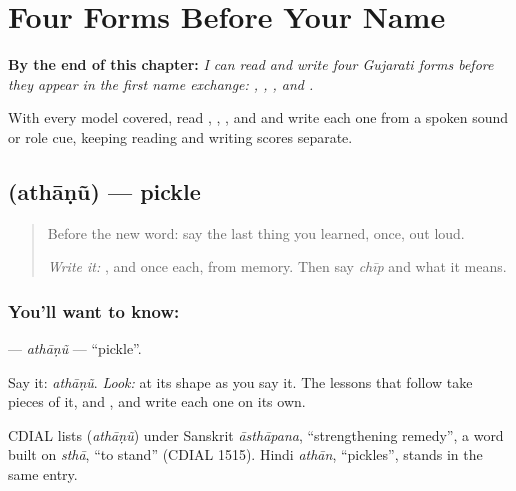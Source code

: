 
\chapter{Four Forms Before Your Name}
\label{ch:gu-first-use-forms-a}

\begin{chapteropening}
\textbf{By the end of this chapter:} \emph{I can read and write four Gujarati forms before they appear in the first name exchange: , , , and .}

With every model covered, read , , , and  and write each one from a spoken sound or role cue, keeping reading and writing scores separate.
\end{chapteropening}

\section[\texorpdfstring{\gu{અથાણું} (athāṇũ)}{અથાણું (athāṇũ)}]{ (athāṇũ) — pickle}

\label{lesson:GU-C04-athaanun}



\begin{quote}
Before the new word: say the last thing you learned, once, out loud.

\emph{Write it:} \textbf{}, \textbf{} and \textbf{} once each, from memory. Then say \emph{chīp} and what it means.
\end{quote}

\subsection*{You'll want to know: }
\textbf{} — \emph{athāṇũ} — \textquotedblleft{}pickle\textquotedblright{}.

Say it: \emph{athāṇũ}. \emph{Look:} at its shape as you say it. The lessons that follow take pieces of it, \textbf{} and \textbf{}, and write each one on its own.

\begin{cousinweb}
CDIAL lists \textbf{} (\emph{athāṇũ}) under Sanskrit \emph{āsthāpana}, \textquotedblleft{}strengthening remedy\textquotedblright{}, a word built on \emph{sthā}, \textquotedblleft{}to stand\textquotedblright{} (CDIAL 1515). Hindi \emph{athān}, \textquotedblleft{}pickles\textquotedblright{}, stands in the same entry.
\end{cousinweb}

